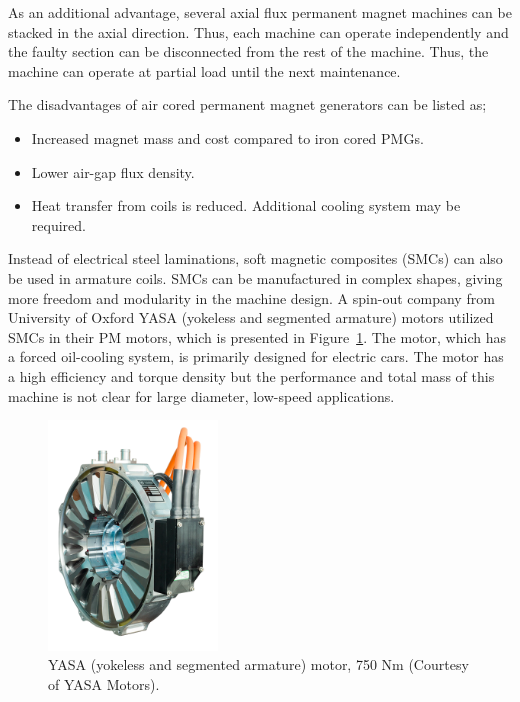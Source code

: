\documentclass[a4paper, 11pt]{article} %
\begin{document}
As an additional advantage, several axial flux permanent magnet machines can be stacked in the axial direction. Thus, each machine can operate independently and the faulty section can be disconnected from the rest of the machine. Thus, the machine can operate at partial load until the next maintenance. 

The disadvantages of air cored permanent magnet generators can be listed as;

\begin{itemize}
	\item Increased magnet mass and cost compared to iron cored PMGs.
	\item Lower air-gap flux density.
	\item Heat transfer from coils is reduced. Additional cooling system may be required.
\end{itemize}

Instead of electrical steel laminations, soft magnetic composites (SMCs) can also be used in armature coils. SMCs can be manufactured in complex shapes, giving more freedom and modularity in the machine design. A spin-out company from University of Oxford YASA (yokeless and segmented armature) motors utilized SMCs in their PM motors, which is presented in Figure~\ref{yasa_motor}. The motor, which has a forced oil-cooling system, is primarily designed for electric cars. The motor has a high efficiency and torque density but the performance and total mass of this machine is not clear for large diameter, low-speed applications.


  \begin{figure}[t]
    \centering
    \includegraphics[width=0.4\textwidth]{yasa_motor}
    \caption{YASA (yokeless and segmented armature) motor, 750 Nm (Courtesy of YASA Motors).} 
    \label{yasa_motor}
  \end{figure}
\end{document}
